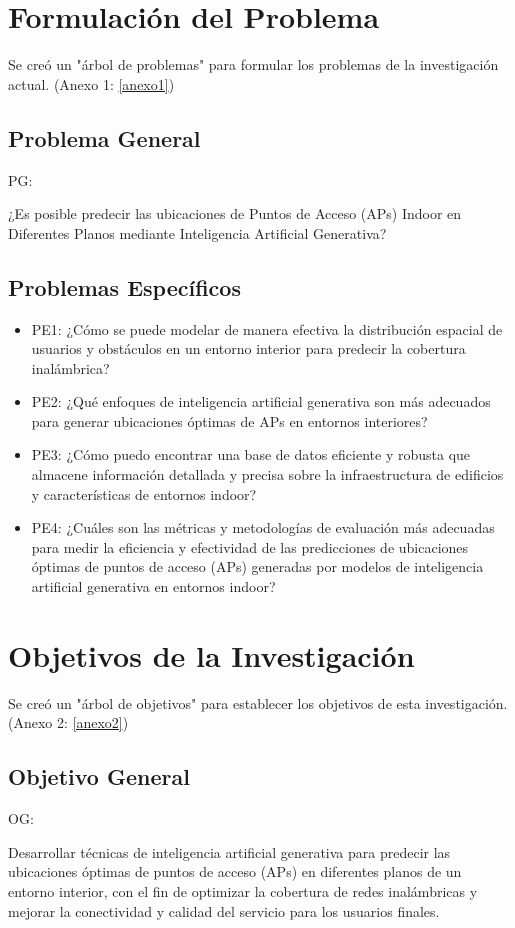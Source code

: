 \section{Formulación del Problema}
Se creó un "árbol de problemas" para formular los problemas de la investigación actual. (Anexo 1: \ref{anexo1})

\subsection{Problema General}
PG: \newcommand{\ProblemaGeneral}{
¿Es posible predecir las ubicaciones de Puntos de Acceso (APs) Indoor en Diferentes Planos  mediante Inteligencia Artificial Generativa?
}
\ProblemaGeneral
\subsection{Problemas Específicos}
\newcommand{\Pbone}{
¿Cómo se puede modelar de manera efectiva la distribución espacial de usuarios y obstáculos en un entorno interior para predecir la cobertura inalámbrica?
}
\newcommand{\Pbtwo}{
¿Qué enfoques de inteligencia artificial generativa son más adecuados para generar ubicaciones óptimas de APs en entornos interiores?
}
\newcommand{\Pbthree}{
¿Cómo puedo encontrar una base de datos eficiente y robusta que almacene información detallada y precisa sobre la infraestructura de edificios y características de entornos indoor?
}
\newcommand{\Pbfour}{
¿Cuáles son las métricas y metodologías de evaluación más adecuadas para medir la eficiencia y efectividad de las predicciones de ubicaciones óptimas de puntos de acceso (APs) generadas por modelos de inteligencia artificial generativa en entornos indoor?
}

\begin{itemize}
	\item PE1: {\Pbone}
	\item PE2: {\Pbtwo}
	\item PE3: {\Pbthree}
	\item PE4: {\Pbfour}
\end{itemize}

\section{Objetivos de la Investigación}
Se creó un "árbol de objetivos" para establecer los objetivos de esta investigación. (Anexo 2: \ref{anexo2})
\subsection{Objetivo General}
OG: \newcommand{\ObjetivoGeneral}{
Desarrollar técnicas de inteligencia artificial generativa para predecir las ubicaciones óptimas de puntos de acceso (APs) en diferentes planos de un entorno interior, con el fin de optimizar la cobertura de redes inalámbricas y mejorar la conectividad y calidad del servicio para los usuarios finales.
}
\ObjetivoGeneral
